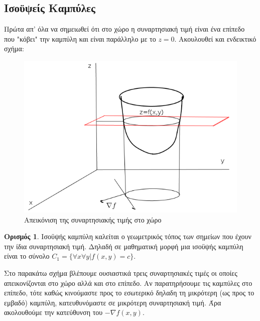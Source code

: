 \documentclass[a4paper,12pt,twoside]{report}
\theoremstyle{plain}
\theoremstyle{definition}
\newtheorem{defn}{Ορισμός}[section] %
\theoremstyle{remark}
\begin{document}
\subsection{Ισοϋψείς Καμπύλες}
Πρώτα απ' όλα να σημειωθεί ότι στο χώρο η συναρτησιακή τιμή είναι ένα επίπεδο που "κόβει" την καμπύλη και είναι παράλληλο με το $z=0$. Ακουλουθεί και ενδεικτικό σχήμα:
\begin{figure}[H]
\includegraphics[scale=0.5]{4}
\centering
    \caption{Απεικόνιση της συναρτησιακής τιμής στο χώρο}
\end{figure}

\begin{defn}
Ισοϋψής καμπύλη καλείται ο γεωμετρικός τόπος των σημείων που έχουν την ίδια συναρτησιακή τιμή. Δηλαδή σε μαθηματική μορφή μια ισοϋψής καμπύλη είναι το σύνολο $C_1 = \{\forall x \forall y| f(x,y) = c\}.$
\end{defn}

Στο παρακάτω σχήμα βλέπουμε ουσιαστικά τρεις συναρτησιακές τιμές οι οποίες απεικονίζονται στο χώρο αλλά και στο επίπεδο. Αν παρατηρήσουμε τις καμπύλες στο επίπεδο, τότε καθώς κινούμαστε προς το εσωτερικό δηλαδη τη μικρότερη (ως προς το εμβαδό) καμπύλη, κατευθυνόμαστε σε μικρότερη συναρτησιακή τιμή. Άρα ακολουθούμε την κατεύθυνση του $-\nabla f(x,y)$.
\end{document}
